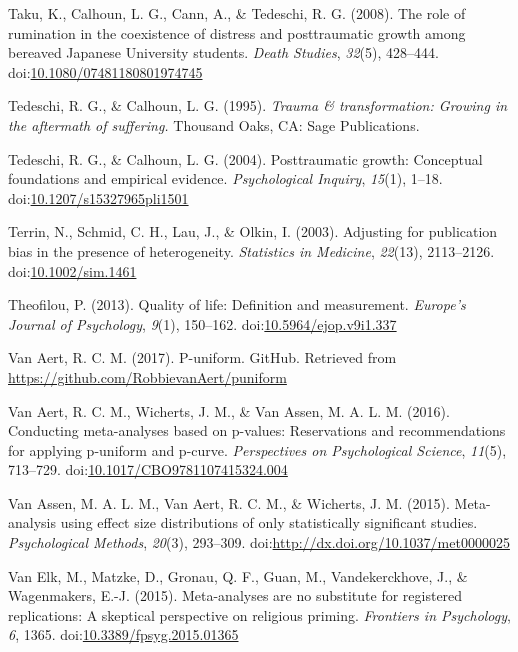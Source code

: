 \documentclass[man]{apa6}
\theoremstyle{definition}
\theoremstyle{definition}
\theoremstyle{definition}
\theoremstyle{remark}
\begin{document}
\hypertarget{ref-Taku2008}{}
Taku, K., Calhoun, L. G., Cann, A., \& Tedeschi, R. G. (2008). The role
of rumination in the coexistence of distress and posttraumatic growth
among bereaved Japanese University students. \emph{Death Studies},
\emph{32}(5), 428--444.
doi:\href{https://doi.org/10.1080/07481180801974745}{10.1080/07481180801974745}

\hypertarget{ref-Tedeschi1995}{}
Tedeschi, R. G., \& Calhoun, L. G. (1995). \emph{Trauma \&
transformation: Growing in the aftermath of suffering.} Thousand Oaks,
CA: Sage Publications.

\hypertarget{ref-Tedeschi2004}{}
Tedeschi, R. G., \& Calhoun, L. G. (2004). Posttraumatic growth:
Conceptual foundations and empirical evidence. \emph{Psychological
Inquiry}, \emph{15}(1), 1--18.
doi:\href{https://doi.org/10.1207/s15327965pli1501}{10.1207/s15327965pli1501}

\hypertarget{ref-Terrin2003}{}
Terrin, N., Schmid, C. H., Lau, J., \& Olkin, I. (2003). Adjusting for
publication bias in the presence of heterogeneity. \emph{Statistics in
Medicine}, \emph{22}(13), 2113--2126.
doi:\href{https://doi.org/10.1002/sim.1461}{10.1002/sim.1461}

\hypertarget{ref-Theofilou2013}{}
Theofilou, P. (2013). Quality of life: Definition and measurement.
\emph{Europe's Journal of Psychology}, \emph{9}(1), 150--162.
doi:\href{https://doi.org/10.5964/ejop.v9i1.337}{10.5964/ejop.v9i1.337}

\hypertarget{ref-VanAert2017}{}
Van Aert, R. C. M. (2017). P-uniform. GitHub. Retrieved from
\url{https://github.com/RobbievanAert/puniform}

\hypertarget{ref-VanAert2016}{}
Van Aert, R. C. M., Wicherts, J. M., \& Van Assen, M. A. L. M. (2016).
Conducting meta-analyses based on p-values: Reservations and
recommendations for applying p-uniform and p-curve. \emph{Perspectives
on Psychological Science}, \emph{11}(5), 713--729.
doi:\href{https://doi.org/10.1017/CBO9781107415324.004}{10.1017/CBO9781107415324.004}

\hypertarget{ref-VanAssen2015}{}
Van Assen, M. A. L. M., Van Aert, R. C. M., \& Wicherts, J. M. (2015).
Meta-analysis using effect size distributions of only statistically
significant studies. \emph{Psychological Methods}, \emph{20}(3),
293--309.
doi:\href{https://doi.org/http://dx.doi.org/10.1037/met0000025}{http://dx.doi.org/10.1037/met0000025}

\hypertarget{ref-VanElk2015}{}
Van Elk, M., Matzke, D., Gronau, Q. F., Guan, M., Vandekerckhove, J., \&
Wagenmakers, E.-J. (2015). Meta-analyses are no substitute for
registered replications: A skeptical perspective on religious priming.
\emph{Frontiers in Psychology}, \emph{6}, 1365.
doi:\href{https://doi.org/10.3389/fpsyg.2015.01365}{10.3389/fpsyg.2015.01365}
\end{document}
